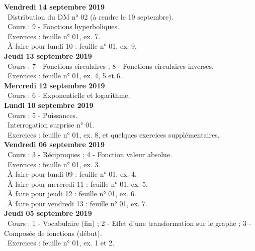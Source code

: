 \documentclass[12pt,a4paper]{article}
\begin{document}
 \noindent\textbf{Vendredi 14 septembre 2019}\\
 \bu\ Distribution du DM n° 02 (à rendre le 19 septembre).\\
 \bu\ Cours : 9 - Fonctions hyperboliques.\\
 \bu\ Exercices : feuille n° 01, ex. 7.\\
 \bu\ À faire pour lundi 10 : feuille n° 01, ex. 9.\vspace{.4cm}\\
 
 \noindent\textbf{\bf Jeudi 13 septembre 2019}\\
 \bu\ Cours : 7 - Fonctions circulaires ; 8 - Fonctions circulaires inverses.\\
 \bu\ Exercices : feuille n° 01, ex. 4, 5 et 6.\vspace{.4cm}\\
     
 \noindent\textbf{\bf Mercredi 12 septembre 2019}\\
 \bu\ Cours : 6 - Exponentielle et logarithme.\vspace{.4cm}\\
 
 \noindent\textbf{\bf Lundi 10 septembre 2019}\\
 \bu\ Cours : 5 - Puissances.\\
 \bu\ Interrogation surprise n° 01.\\
 \bu\ Exercices : feuille n° 01, ex. 8, et quelques exercices supplémentaires.\vspace{.4cm}\\
 
\noindent\textbf{Vendredi 06 septembre 2019}\\
\bu\ Cours : 3 - Réciproques ; 4 - Fonction valeur absolue.\\
\bu\ Exercices : feuille n° 01, ex. 3.\\
\bu\ À faire pour lundi 09 : feuille n° 01, ex. 4.\\
\bu\ À faire pour mercredi 11 : feuille n° 01, ex. 5.\\
\bu\ À faire pour jeudi 12 : feuille n° 01, ex. 6.\\
\bu\ À faire pour vendredi 13 : feuille n° 01, ex. 7.\vspace{.4cm}\\
 
\noindent\textbf{\bf Jeudi 05 septembre 2019}\\
\bu\ Cours : 1 - Vocabulaire (fin) ; 2 - Effet d'une transformation sur le graphe ; 3 - Composée de fonctions 
(début).\\
\bu\ Exercices : feuille n° 01, ex. 1 et 2.\vspace{.4cm}\\
     
\end{document}
